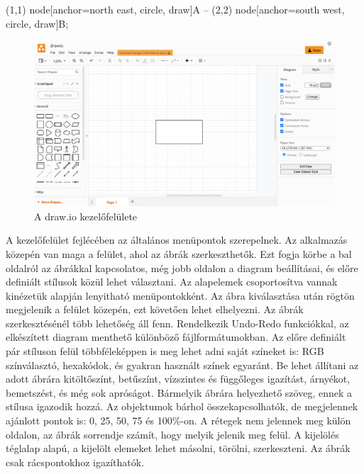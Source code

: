 \begin{tikzcode}
\draw 
(1,1) node[anchor=north east, circle, draw]{A} 
	-- 
(2,2) node[anchor=south west, circle, draw]{B}; 
\end{tikzcode}







\begin{figure}[!h]
	\includegraphics[width=\textwidth]{images/drawio.png}
	\caption{A draw.io kezelőfelülete \cite{drawio}}
\label{fig:drawio}
\end{figure}

\noindent
A kezelőfelület fejlécében az általános menüpontok szerepelnek. Az alkalmazás közepén van maga a felület, ahol az ábrák szerkeszthetők. Ezt fogja körbe a bal oldalról az ábrákkal kapcsolatos, még jobb oldalon a diagram beállításai, és előre definiált stílusok közül lehet választani. Az alapelemek csoportosítva vannak kinézetük alapján lenyitható menüpontokként. Az ábra kiválasztása után rögtön megjelenik a felület közepén, ezt követően lehet elhelyezni. Az ábrák szerkesztésénél több lehetőség áll fenn. Rendelkezik Undo-Redo funkciókkal, az elkészített diagram menthető különböző fájlformátumokban. Az előre definiált pár stíluson felül többféleképpen is meg lehet adni saját színeket is: RGB színválasztó, hexakódok, és gyakran használt színek egyaránt. Be lehet állítani az adott ábrára kitöltőszínt, betűszínt, vízszintes és függőleges igazítást, árnyékot, bemetszést, és még sok apróságot. Bármelyik ábrára helyezhető szöveg, ennek a stílusa igazodik hozzá. Az objektumok bárhol összekapcsolhatók, de megjelennek ajánlott pontok is: 0, 25, 50, 75 és 100\%-on. A rétegek nem jelennek meg külön oldalon, az ábrák sorrendje számít, hogy melyik jelenik meg felül. A kijelölés téglalap alapú, a kijelölt elemeket lehet másolni, törölni, szerkeszteni. Az ábrák csak rácspontokhoz igazíthatók.


